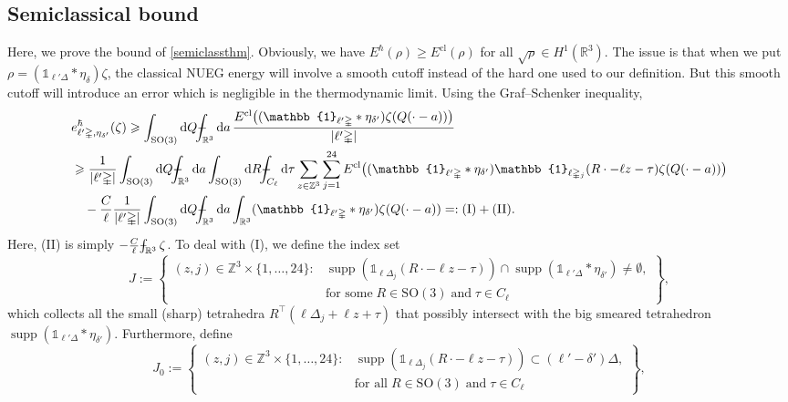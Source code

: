 \documentclass[final,onefignum,onetabnum,reqno]{amsart}
\theoremstyle{remark}
\renewcommand{\ge}{\geqslant}
\DeclareMathOperator{\supp}{supp}
\newcommand{\RR}{\mathbb{R}}
\newcommand{\ZZ}{\mathbb{Z}}
\newcommand{\SO}{\mathrm{SO}}
\newcommand{\cl}{\mathrm{cl}} %
\newcommand{\iden}{\mathbb{1}} %
\newcommand{\tetra}{\mathbb{\Delta}} %
\newcommand{\dd}{\mathrm{d}} %
\def\Xint#1{\mathchoice
{\XXint\displaystyle\textstyle{#1}}%
{\XXint\textstyle\scriptstyle{#1}}%
{\XXint\scriptstyle\scriptscriptstyle{#1}}%
{\XXint\scriptscriptstyle\scriptscriptstyle{#1}}%
\!\int}
\def\XXint#1#2#3{{\setbox0=\hbox{$#1{#2#3}{\int}$ }
\vcenter{\hbox{$#2#3$ }}\kern-.6\wd0}}
\def\dashint{\Xint-}
\begin{document}
\subsection{Semiclassical bound} \label{subsec:Semi-limit}
Here, we prove the bound of \cref{semiclassthm}. Obviously, we have
$E^\hbar(\rho)\ge E^\cl(\rho)$ for all $\sqrt{\rho}\in H^1(\RR^3)$. The issue is that when we put $\rho=(\iden_{\ell'\tetra}*\eta_{\delta})\zeta$, the classical NUEG energy will involve a smooth cutoff instead of the hard one used to our definition. But this smooth cutoff will 
introduce an error which is negligible in the thermodynamic limit.
Using the Graf--Schenker inequality,
\begin{align*}
&e_{\ell'\tetra,\eta_{\delta'}}^\hbar(\zeta)
\ge \int_{\SO(3)}\dd Q\dashint_{\RR^3}\dd a\,\frac{E^\cl\bigl((\iden_{\ell'\tetra}*\eta_{\delta'})\zeta(Q(\cdot-a))\bigr)}{|\ell'\tetra|} \\
&\ge \frac{1}{|\ell'\tetra|} \int_{\SO(3)}\dd Q\dashint_{\RR^3}\dd a \int_{\SO(3)}\dd R \dashint_{C_\ell}\dd\tau \sum_{z\in\ZZ^3}\sum_{j=1}^{24} 
E^\cl\bigl((\iden_{\ell'\tetra}*\eta_{\delta'})\iden_{\ell\tetra_j}(R\cdot-\ell z-\tau)\zeta(Q(\cdot-a))\bigr) \\
&\quad -\frac{C}{\ell} \frac{1}{|\ell'\tetra|} \int_{\SO(3)}\dd Q\dashint_{\RR^3}\dd a \int_{\RR^3} (\iden_{\ell'\tetra}*\eta_{\delta'})\zeta(Q(\cdot-a))=:\mathrm{(I)} + \mathrm{(II)}.
\end{align*}
Here, (II) is simply $-\frac{C}{\ell} \dashint_{\RR^3}\zeta$. To deal with (I), we define the index set
$$
J:=\left\{ \begin{aligned}(z,j)\in \ZZ^3\times\{1,\ldots,24\} : &\supp( \iden_{\ell\tetra_j}(R\cdot - \ell z - \tau)) \cap \supp(\iden_{\ell'\tetra}*\eta_{\delta'})\neq \emptyset,\\
&\text{for some}\;R\in\SO(3)\;\text{and}\; \tau\in C_\ell \end{aligned} \right\},
$$
which collects all the small (sharp) tetrahedra $R^\top(\ell\tetra_j + \ell z + \tau)$ that possibly intersect with the big smeared tetrahedron $\supp(\iden_{\ell'\tetra}*\eta_{\delta'})$. 
Furthermore, define
$$
J_0:=\left\{ \begin{aligned}(z,j)\in \ZZ^3\times\{1,\ldots,24\} : &\supp( \iden_{\ell\tetra_j}(R\cdot - \ell z - \tau)) \subset (\ell'-\delta')\tetra,\\
&\text{for all}\;R\in\SO(3)\;\text{and}\; \tau\in C_\ell \end{aligned} \right\},
$$
\end{document}
